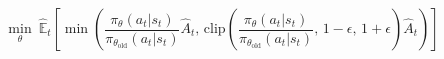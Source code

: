 %
\begin{equation} \label{eqn:PPO_clip}
    \min_\theta\ \hat{\mathbb{E}}_t \left[\min\left(\frac{\pi_{\theta}(a_t|s_t)}{\pi_{\theta_\text{old}}(a_t|s_t)}\hat{A}_t,\,\text{clip}\left(\frac{\pi_{\theta}(a_t|s_t)}{\pi_{\theta_\text{old}}(a_t|s_t)},\, 1-\epsilon,\, 1+\epsilon\right)\hat{A}_t\right)\right]
\end{equation}


